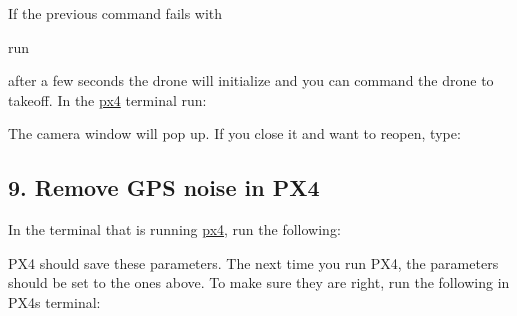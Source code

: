 If the previous command fails with


\begin{DoxyCode}{0}
\end{DoxyCode}


run 
\begin{DoxyCode}{0}
\end{DoxyCode}


after a few seconds the drone will initialize and you can command the drone to takeoff. In the \mbox{\hyperlink{namespacepx4}{px4}} terminal run\+:


\begin{DoxyCode}{0}
\end{DoxyCode}


The camera window will pop up. If you close it and want to reopen, type\+: 
\begin{DoxyCode}{0}
\end{DoxyCode}


\subsection*{9. Remove G\+PS noise in P\+X4}

In the terminal that is running \mbox{\hyperlink{namespacepx4}{px4}}, run the following\+:


\begin{DoxyCode}{0}
\end{DoxyCode}


P\+X4 should save these parameters. The next time you run P\+X4, the parameters should be set to the ones above. To make sure they are right, run the following in P\+X4\textquotesingle{}s terminal\+:


\begin{DoxyCode}{0}
\end{DoxyCode}
 